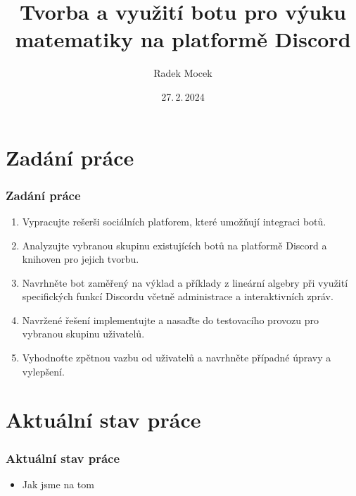 \documentclass[FM]{tulpresentation}
\title{Tvorba a využití botu pro výuku matematiky na platformě Discord}
\author{Radek Mocek}
\institute{}
\date{27.\,2.\,2024}
\begin{document}
	\TULtitleframe
	\section{Zadání práce}
	\begin{frame}[fragile]
		\frametitle{Zadání práce}
		\begin{enumerate}
			\item Vypracujte rešerši sociálních platforem, které umožňují integraci botů.
			\item Analyzujte vybranou skupinu existujících botů na platformě Discord a knihoven pro jejich tvorbu.
			\item Navrhněte bot zaměřený na výklad a příklady z lineární algebry při využití specifických funkcí Discordu včetně administrace a interaktivních zpráv.
			\item Navržené řešení implementujte a nasaďte do testovacího provozu pro vybranou skupinu uživatelů.
			\item Vyhodnoťte zpětnou vazbu od uživatelů a navrhněte případné úpravy a vylepšení.
		\end{enumerate}
	\end{frame}
	\section{Aktuální stav práce}
	\begin{frame}[fragile]
		\frametitle{Aktuální stav práce}
		\begin{itemize}
			\item Jak jsme na tom
		\end{itemize}
	\end{frame}
\end{document}
